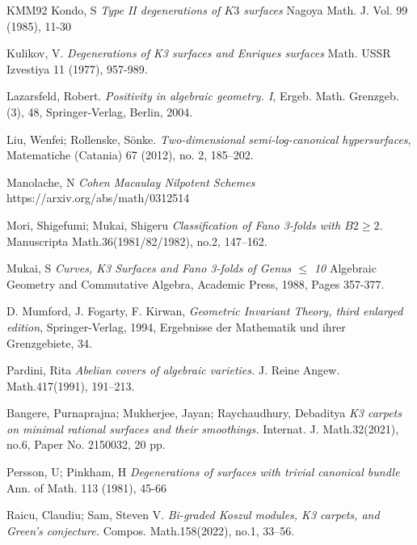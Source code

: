 \documentclass[11pt,twoside]{amsart}
\theoremstyle{plain}
\numberwithin{equation}{section}
\theoremstyle{definition}
\begin{document}
\begin{thebibliography}{KMM92}
Kondo, S
\emph{Type II degenerations of $K3$ surfaces}
Nagoya Math. J. Vol. 99 (1985), 11-30



Kulikov, V. 
\emph{Degenerations of K3 surfaces and Enriques surfaces} Math. USSR Izvestiya 11 (1977), 957-989.





\color{black}

Lazarsfeld, Robert. 
\emph{Positivity in algebraic geometry. I},
Ergeb. Math. Grenzgeb. (3), 48, 
Springer-Verlag, Berlin, 2004.

Liu, Wenfei; Rollenske, Sönke. \emph{Two-dimensional semi-log-canonical hypersurfaces}, 
Matematiche (Catania) 67 (2012), no. 2, 185–202.

\color{black}
Manolache, N
\emph{Cohen Macaulay Nilpotent Schemes}
https://arxiv.org/abs/math/0312514

Mori, Shigefumi; Mukai, Shigeru
\emph{Classification of Fano 3-folds with $B2 \geq 2$.}
Manuscripta Math.36(1981/82/1982), no.2, 147–162.


Mukai, S
\emph{Curves, K3 Surfaces and Fano 3-folds of Genus $\leq$ 10}
Algebraic Geometry and Commutative Algebra, Academic Press,
1988, Pages 357-377.

  \color{black}
  
 D. Mumford, J. Fogarty, F. Kirwan, 
\emph{Geometric Invariant Theory, third enlarged edition}, 
Springer-Verlag, 1994, Ergebnisse der Mathematik und ihrer Grenzgebiete, 
{34}.

  \color{black}
Pardini, Rita
\emph{Abelian covers of algebraic varieties.}
J. Reine Angew. Math.417(1991), 191–213.

Bangere, Purnaprajna; Mukherjee, Jayan; Raychaudhury, Debaditya
\emph{K3 carpets on minimal rational surfaces and their smoothings.}
Internat. J. Math.32(2021), no.6, Paper No. 2150032, 20 pp.


Persson, U; Pinkham, H 
\emph{Degenerations of surfaces with trivial canonical bundle}
Ann. of Math. 113 (1981), 45-66

Raicu, Claudiu; Sam, Steven V.
\emph{Bi-graded Koszul modules, K3 carpets, and Green's conjecture.}
Compos. Math.158(2022), no.1, 33–56.



\end{thebibliography}
\end{document}
